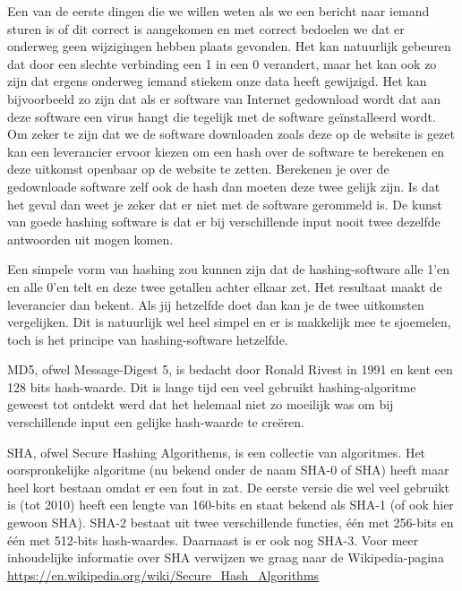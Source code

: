 Een van de eerste dingen die we willen weten als we een bericht naar iemand sturen is of dit correct is aangekomen en met correct bedoelen we dat er onderweg geen wijzigingen hebben plaats gevonden. Het kan natuurlijk gebeuren dat door een slechte verbinding een 1 in een 0 verandert, maar het kan ook zo zijn dat ergens onderweg iemand stiekem onze data heeft gewijzigd. Het kan bijvoorbeeld zo zijn dat als er software van Internet gedownload wordt dat aan deze software een virus hangt die tegelijk met de software ge\"installeerd wordt. Om zeker te zijn dat we de software downloaden zoals deze op de website is gezet kan een leverancier ervoor kiezen om een hash over de software te berekenen en deze uitkomst openbaar op de website te zetten. Berekenen je over de gedownloade software zelf ook de hash dan moeten deze twee gelijk zijn. Is dat het geval dan weet je zeker dat er niet met de software gerommeld is. De kunst van goede hashing software is dat er bij verschillende input nooit twee dezelfde antwoorden uit mogen komen.

Een simpele vorm van hashing zou kunnen zijn dat de hashing-software alle 1'en en alle 0'en telt en deze twee getallen achter elkaar zet. Het resultaat maakt de leverancier dan bekent. Als jij hetzelfde doet dan kan je de twee uitkomsten vergelijken. Dit is natuurlijk wel heel simpel en er is makkelijk mee te sjoemelen, toch is het principe van hashing-software hetzelfde.

MD5, ofwel Message-Digest 5, is bedacht door Ronald Rivest in 1991 en kent een 128 bits hash-waarde. Dit is lange tijd een veel gebruikt hashing-algoritme geweest tot ontdekt werd dat het helemaal niet zo moeilijk was om bij verschillende input een gelijke hash-waarde te cre\"eren.

SHA, ofwel Secure Hashing Algorithems, is een collectie van algoritmes. Het oorspronkelijke algoritme (nu bekend onder de naam SHA-0 of SHA) heeft maar heel kort bestaan omdat er een fout in zat. De eerste versie die wel veel gebruikt is (tot 2010) heeft een lengte van 160-bits en staat bekend als SHA-1 (of ook hier gewoon SHA). SHA-2 bestaat uit twee verschillende functies, \'e\'en met 256-bits en \'e\'en met 512-bits hash-waardes. Daarnaast is er ook nog SHA-3. Voor meer inhoudelijke informatie over SHA verwijzen we graag naar de Wikipedia-pagina \url{https://en.wikipedia.org/wiki/Secure\_Hash\_Algorithms}

